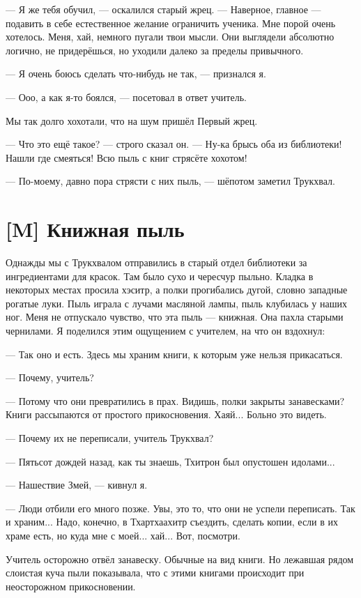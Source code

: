 --- Я же тебя обучил, --- оскалился старый жрец.
--- Наверное, главное --- подавить в себе естественное желание ограничить ученика.
Мне порой очень хотелось.
Меня, хай, немного пугали твои мысли.
Они выглядели абсолютно логично, не придерёшься, но уходили далеко за пределы привычного.

--- Я очень боюсь сделать что-нибудь не так, --- признался я.

--- Ооо, а как я-то боялся, --- посетовал в ответ учитель.

Мы так долго хохотали, что на шум пришёл Первый жрец.

--- Что это ещё такое? --- строго сказал он.
--- Ну-ка брысь оба из библиотеки!
Нашли где смеяться!
Всю пыль с книг стрясёте хохотом!

--- По-моему, давно пора стрясти с них пыль, --- шёпотом заметил Трукхвал.

\section{[M] Книжная пыль}

Однажды мы с Трукхвалом отправились в старый отдел библиотеки за ингредиентами для красок.
Там было сухо и чересчур пыльно.
Кладка в некоторых местах просила хэситр, а полки прогибались дугой, словно западные рогатые луки.
Пыль играла с лучами масляной лампы, пыль клубилась у наших ног.
Меня не отпускало чувство, что эта пыль --- книжная.
Она пахла старыми чернилами.
Я поделился этим ощущением с учителем, на что он вздохнул:

--- Так оно и есть.
Здесь мы храним книги, к которым уже нельзя прикасаться.

--- Почему, учитель?

--- Потому что они превратились в прах.
Видишь, полки закрыты занавесками?
Книги рассыпаются от простого прикосновения.
Хаяй...
Больно это видеть.

--- Почему их не переписали, учитель Трукхвал?

--- Пятьсот дождей назад, как ты знаешь, Тхитрон был опустошен идолами...

--- Нашествие Змей, --- кивнул я.

--- Люди отбили его много позже.
Увы, это то, что они не успели переписать.
Так и храним...
Надо, конечно, в Тхартхаахитр съездить, сделать копии, если в их храме есть, но куда мне с моей... хай...
Вот, посмотри.

Учитель осторожно отвёл занавеску.
Обычные на вид книги.
Но лежавшая рядом слоистая куча пыли показывала, что с этими книгами происходит при неосторожном прикосновении.


